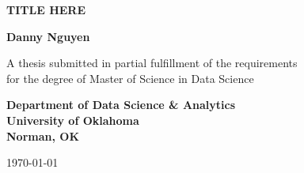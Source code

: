 \begin{titlepage}
    \centering
    \vspace*{1in}
    
    {\Huge \bfseries TITLE HERE \par}
    
    \vspace{1.5in}
    
    {\Large \bfseries Danny Nguyen \par}
    
    \vspace{0.5in}
    
    A thesis submitted in partial fulfillment of the requirements\\
    for the degree of Master of Science in Data Science
    
    \vspace{1.5in}
    
    \textbf{Department of Data Science \& Analytics}\\
    \textbf{University of Oklahoma}\\
    \textbf{Norman, OK}
    
    \vfill
    
    {\large \today}
\end{titlepage}